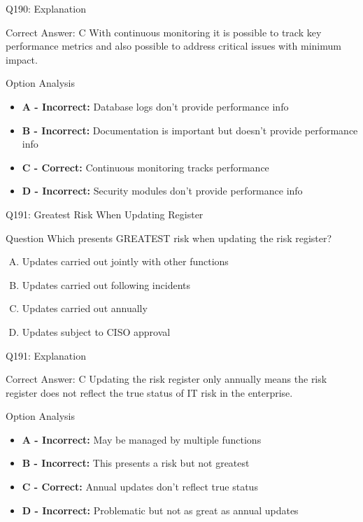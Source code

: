\documentclass{beamer}
\begin{document}
	\begin{frame}{Q190: Explanation}
		\begin{block}{Correct Answer: C}
			With continuous monitoring it is possible to track key performance metrics and also possible to address critical issues with minimum impact.
		\end{block}
		\begin{block}{Option Analysis}
			\begin{itemize}
				\item \textbf{A - Incorrect:} Database logs don't provide performance info
				\item \textbf{B - Incorrect:} Documentation is important but doesn't provide performance info
				\item \textbf{C - Correct:} Continuous monitoring tracks performance
				\item \textbf{D - Incorrect:} Security modules don't provide performance info
			\end{itemize}
		\end{block}
	\end{frame}
	
	\begin{frame}{Q191: Greatest Risk When Updating Register}
		\begin{block}{Question}
			Which presents GREATEST risk when updating the risk register?
		\end{block}
		\begin{enumerate}[(A)]
			\item Updates carried out jointly with other functions
			\item Updates carried out following incidents
			\item Updates carried out annually
			\item Updates subject to CISO approval
		\end{enumerate}
	\end{frame}
	
	\begin{frame}{Q191: Explanation}
		\begin{block}{Correct Answer: C}
			Updating the risk register only annually means the risk register does not reflect the true status of IT risk in the enterprise.
		\end{block}
		\begin{block}{Option Analysis}
			\begin{itemize}
				\item \textbf{A - Incorrect:} May be managed by multiple functions
				\item \textbf{B - Incorrect:} This presents a risk but not greatest
				\item \textbf{C - Correct:} Annual updates don't reflect true status
				\item \textbf{D - Incorrect:} Problematic but not as great as annual updates
			\end{itemize}
		\end{block}
	\end{frame}
	
\end{document}
